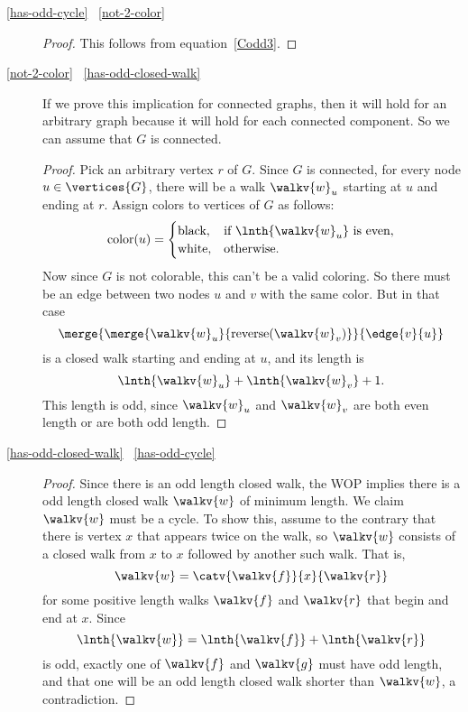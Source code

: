 \begin{description}

\item[\ref{has-odd-cycle} \QIMPLIES\ \ref{not-2-color}]
\begin{proof}
This follows from equation~\ref{Codd3}.
\end{proof}

\item[\ref{not-2-color} \QIMPLIES\ \ref{has-odd-closed-walk}]

  If we prove this implication for connected graphs, then it will hold
  for an arbitrary graph because it will hold for each
  connected component.  So we can assume that $G$ is connected.
\begin{proof}

  Pick an arbitrary vertex $r$ of $G$.  Since $G$ is connected, for every
  node $u \in \vertices{G}$, there will be a walk $\walkv{w}_u$ starting
  at $u$ and ending at $r$.  Assign colors to vertices of $G$ as follows:
\[
\text{color}(u) = \begin{cases}
                   \text{black}, & \text{if $\lnth{\walkv{w}_u}$ is even},\\
                   \text{white}, & \text{otherwise}.
\end{cases}
\]
Now since $G$ is not colorable, this can't be a valid coloring.  So there
must be an edge between two nodes $u$ and $v$ with the same color.  But in
that case
\[
\merge{\merge{\walkv{w}_u}{\text{reverse}(\walkv{w}_v)}}{\edge{v}{u}}
\]
is a closed walk starting and ending at $u$, and its length is
\[
\lnth{\walkv{w}_u} + \lnth{\walkv{w}_v} + 1.
\]
This length is odd, since $\walkv{w}_u$ and $\walkv{w}_v$ are both even
length or are both odd length.
\end{proof}

\item[\ref{has-odd-closed-walk} \QIMPLIES\ \ref{has-odd-cycle}]

\begin{proof}
  Since there is an odd length closed walk, the WOP implies there is a odd
  length closed walk $\walkv{w}$ of minimum length.  We claim $\walkv{w}$
  must be a cycle.  To show this, assume to the contrary that there is
  vertex $x$ that appears twice on the walk, so $\walkv{w}$ consists of a
  closed walk from $x$ to $x$ followed by another such walk.  That is,
\[
\walkv{w} = \catv{\walkv{f}}{x}{\walkv{r}}
\]
for some positive length walks $\walkv{f}$ and $\walkv{r}$ that begin and
end at $x$.  Since
\[
\lnth{\walkv{w}} =  \lnth{\walkv{f}}+ \lnth{\walkv{r}}
\]
is odd, exactly one of $\walkv{f}$ and $\walkv{g}$ must have odd length,
and that one will be an odd length closed walk shorter than $\walkv{w}$, a
contradiction.

\end{proof}
\end{description}

